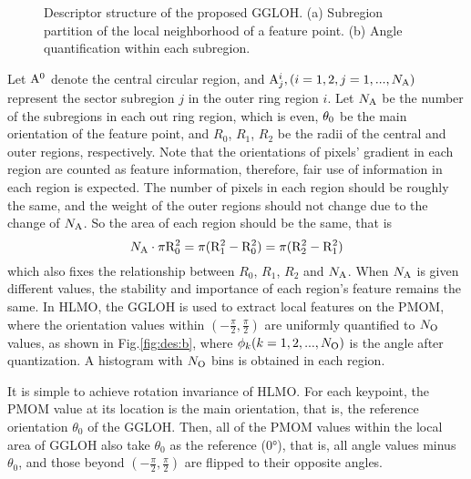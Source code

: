 \begin{figure}[!h]
    \centering
    \hfil
    \caption{Descriptor structure of the proposed GGLOH. (a) Subregion partition of the local neighborhood of a feature point. (b) Angle quantification within each subregion.}
    \label{fig:des}
\end{figure}

Let ${{\rm{A}}^0}$ denote the central circular region, and ${\rm{A}}_j^i,(i=1,2, j=1,...,{N_{\rm{A}}})$ represent the sector subregion $j$ in the outer ring region $i$. Let ${N_{\rm{A}}}$ be the number of the subregions in each out ring region, which is even, ${\theta _{\rm{0}}}$ be the main orientation of the feature point, and $R_0$, $R_1$, $R_2$ be the radii of the central and outer regions, respectively. Note that the orientations of pixels’ gradient in each region are counted as feature information, therefore, fair use of information in each region is expected. The number of pixels in each region should be roughly the same, and the weight of the outer regions should not change due to the change of ${N_{\rm{A}}}$. So the area of each region should be the same, that is
\begin{equation} \label{eqggloh}
{N_{\rm{A}}} \cdot \pi {\rm{R}}_{\rm{0}}^2 = \pi ({\rm{R}}_{\rm{1}}^2 - {\rm{R}}_{\rm{0}}^2) = \pi ({\rm{R}}_{\rm{2}}^2 - {\rm{R}}_{\rm{1}}^2)
\end{equation}
which also fixes the relationship between $R_0$, $R_1$, $R_2$ and ${N_{\rm{A}}}$. When ${N_{\rm{A}}}$ is given different values, the stability and importance of each region’s feature remains the same. In HLMO, the GGLOH is used to extract local features on the PMOM, where the orientation values within $(-\frac{\pi}{2},\frac{\pi}{2})$ are uniformly quantified to ${N_{\rm{O}}}$ values, as shown in Fig.\ref{fig:des:b}, where ${\phi_k}(k=1,2,...,{N_{\rm{O}}})$ is the angle after quantization. A histogram with ${N_{\rm{O}}}$ bins is obtained in each region.

It is simple to achieve rotation invariance of HLMO. For each keypoint, the PMOM value at its location is the main orientation, that is, the reference orientation ${\theta _0}$ of the GGLOH. Then, all of the PMOM values within the local area of GGLOH also take ${\theta _0}$ as the reference (0°), that is, all angle values minus ${\theta _0}$, and those beyond $(-\frac{\pi}{2},\frac{\pi}{2})$ are flipped to their opposite angles.


